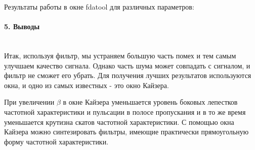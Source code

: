 \documentclass[12pt,a4paper]{report}
\begin{document}
Результаты работы в окне fdatool для различных параметров:

\begin{figure}[h!]
\end{figure}

\begin{figure}[h!]
\end{figure}

\begin{figure}[h!]
\end{figure}

\paragraph{5. Выводы\\\\}

Итак, используя фильтр, мы  устраняем большую часть помех и тем самым улучшаем качество сигнала. Однако часть шума может совпадать с сигналом, и фильтр не сможет его убрать. Для получения лучших результатов используются окна, и одно из самых известных - это окно Кайзера.

При увеличении $\beta$ в окне Кайзера уменьшается уровень боковых лепестков частотной характеристики и пульсации в полосе пропускания и в то же время уменьшается крутизна скатов частотной характеристики. С помощью окна Кайзера можно синтезировать фильтры, имеющие практически прямоугольную форму частотной характеристики.
\end{document}
